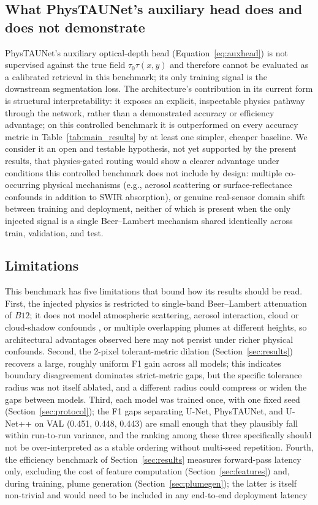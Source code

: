 \documentclass[10pt,twocolumn]{article}
\begin{document}
\subsection{What PhysTAUNet's auxiliary head does and does not demonstrate}
\label{sec:disc_phys}

PhysTAUNet's auxiliary optical-depth head (Equation~\eqref{eq:auxhead}) is not supervised against the true field $\tau_0\tau(x,y)$ and therefore cannot be evaluated as a calibrated retrieval in this benchmark; its only training signal is the downstream segmentation loss. The architecture's contribution in its current form is structural interpretability: it exposes an explicit, inspectable physics pathway through the network, rather than a demonstrated accuracy or efficiency advantage; on this controlled benchmark it is outperformed on every accuracy metric in Table~\ref{tab:main_results} by at least one simpler, cheaper baseline. We consider it an open and testable hypothesis, not yet supported by the present results, that physics-gated routing would show a clearer advantage under conditions this controlled benchmark does not include by design: multiple co-occurring physical mechanisms (e.g., aerosol scattering or surface-reflectance confounds in addition to SWIR absorption), or genuine real-sensor domain shift between training and deployment, neither of which is present when the only injected signal is a single Beer--Lambert mechanism shared identically across train, validation, and test.

\subsection{Limitations}
\label{sec:limitations}

This benchmark has five limitations that bound how its results should be read. First, the injected physics is restricted to single-band Beer--Lambert attenuation of $B12$; it does not model atmospheric scattering, aerosol interaction, cloud or cloud-shadow confounds \citep{ulmer2025deep}, or multiple overlapping plumes at different heights, so architectural advantages observed here may not persist under richer physical confounds. Second, the 2-pixel tolerant-metric dilation (Section~\ref{sec:results}) recovers a large, roughly uniform F1 gain across all models; this indicates boundary disagreement dominates strict-metric gaps, but the specific tolerance radius was not itself ablated, and a different radius could compress or widen the gaps between models. Third, each model was trained once, with one fixed seed (Section~\ref{sec:protocol}); the F1 gaps separating U-Net, PhysTAUNet, and U-Net++ on VAL (0.451, 0.448, 0.443) are small enough that they plausibly fall within run-to-run variance, and the ranking among these three specifically should not be over-interpreted as a stable ordering without multi-seed repetition. Fourth, the efficiency benchmark of Section~\ref{sec:results} measures forward-pass latency only, excluding the cost of feature computation (Section~\ref{sec:features}) and, during training, plume generation (Section~\ref{sec:plumegen}); the latter is itself non-trivial and would need to be included in any end-to-end deployment latency 
\end{document}
